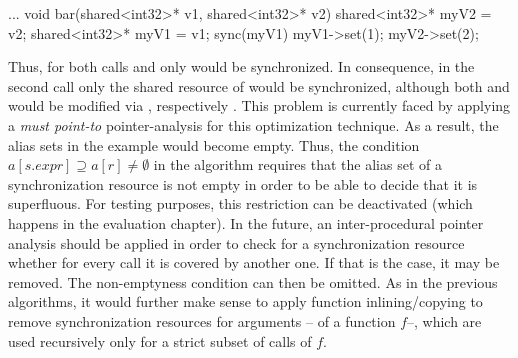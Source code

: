 \begin{ccode}
...
void bar(shared<int32>* v1, shared<int32>* v2) { 
  shared<int32>* myV2 = v2; 
  shared<int32>* myV1 = v1;
  sync(myV1) { 
    myV1->set(1); 
    myV2->set(2); 
  } 
}
\end{ccode}
Thus, for both calls  and  only  would be synchronized. In consequence, in the second call only the shared resource of  would be synchronized, although both  and  would be modified via , respectively . This problem is currently faced by applying a \textit{must point-to} pointer-analysis for this optimization technique. As a result, the alias sets in the example would become empty. Thus, the condition $a[s.\mathit{expr}] \supseteq a[r] \neq \emptyset$ in the algorithm requires that the alias set of a synchronization resource is not empty in order to be able to decide that it is superfluous. For testing purposes, this restriction can be deactivated (which happens in the evaluation chapter). In the future, an inter-procedural pointer analysis should be applied in order to check for a synchronization resource whether for every call it is covered by another one. If that is the case, it may be removed. The non-emptyness condition can then be omitted. As in the previous algorithms, it would further make sense to apply function inlining/copying to remove synchronization resources for arguments -- of a function $f$--, which are used recursively only for a strict subset of calls of $f$. 

